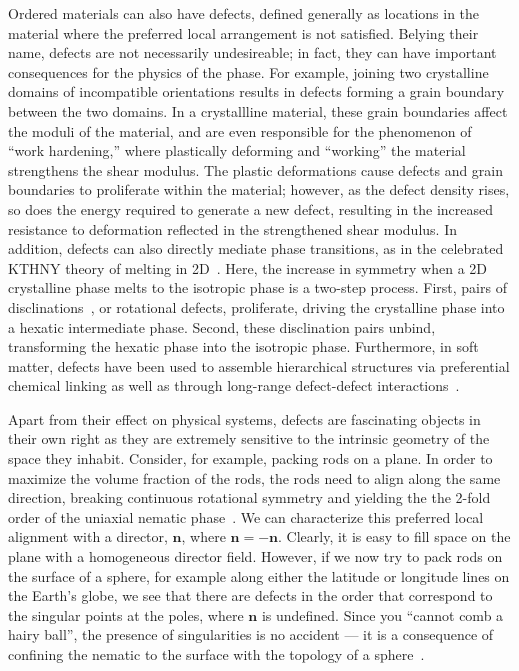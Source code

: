 Ordered materials can also have defects, defined generally as locations in the material where the preferred local arrangement is not satisfied.
Belying their name, defects are not necessarily undesireable; in fact, they can have important consequences for the physics of the phase.
For example, joining two crystalline domains of incompatible orientations results in defects forming a grain boundary between the two domains.
In a crystallline material, these grain boundaries affect the moduli of the material, and are even responsible for the phenomenon of ``work hardening,'' where plastically deforming and ``working'' the material strengthens the shear modulus.
The plastic deformations cause defects and grain boundaries to proliferate within the material; however, as the defect density rises, so does the energy required to generate a new defect, resulting in the increased resistance to deformation reflected in the strengthened shear modulus.
In addition, defects can also directly mediate phase transitions, as in the celebrated KTHNY theory of melting in 2D~\cite{RN161,RN163}.
Here, the increase in symmetry when a 2D crystalline phase melts to the isotropic phase is a two-step process.
First, pairs of disclinations~\cite{RN61,RN203}, or rotational defects, proliferate, driving the crystalline phase into a hexatic intermediate phase.
Second, these disclination pairs unbind, transforming the hexatic phase into the isotropic phase.
Furthermore, in soft matter, defects have been used to assemble hierarchical structures via preferential chemical linking as well as through long-range defect-defect interactions~\cite{RN43,RN50,RN150,RN157}.

Apart from their effect on physical systems, defects are fascinating objects in their own right as they are extremely sensitive to the intrinsic geometry of the space they inhabit.
Consider, for example, packing rods on a plane.
In order to maximize the volume fraction of the rods, the rods need to align along the same direction, breaking continuous rotational symmetry and yielding the the 2-fold order of the uniaxial nematic phase~\cite{RN204}.
We can characterize this preferred local alignment with a director, $\mathbf{n}$, where $\mathbf{n} = \mathbf{-n}$.
Clearly, it is easy to fill space on the plane with a homogeneous director field.
However, if we now try to pack rods on the surface of a sphere, for example along either the latitude or longitude lines on the Earth's globe, we see that there are defects in the order that correspond to the singular points at the poles, where $\mathbf{n}$ is undefined.
Since you ``cannot comb a hairy ball'', the presence of singularities is no accident --- it is a consequence of confining the nematic to the surface with the topology of a sphere~\cite{RN209,RN169}.

